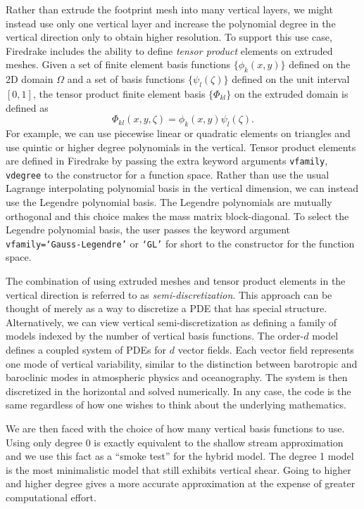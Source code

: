 \documentclass{article}
\theoremstyle{definition}
\theoremstyle{plain}
\begin{document}
Rather than extrude the footprint mesh into many vertical layers, we might instead use only one vertical layer and increase the polynomial degree in the vertical direction only to obtain higher resolution.
To support this use case, Firedrake includes the ability to define \emph{tensor product} elements on extruded meshes.
Given a set of finite element basis functions $\{\phi_k(x, y)\}$ defined on the 2D domain $\Omega$ and a set of basis functions $\{\psi_l(\zeta)\}$ defined on the unit interval $[0, 1]$, the tensor product finite element basis $\{\Phi_{kl}\}$ on the extruded domain is defined as
\begin{equation}
    \Phi_{kl}(x, y, \zeta) = \phi_k(x, y)\psi_l(\zeta).
\end{equation}
For example, we can use piecewise linear or quadratic elements on triangles and use quintic or higher degree polynomials in the vertical.
Tensor product elements are defined in Firedrake by passing the extra keyword arguments \texttt{vfamily}, \texttt{vdegree} to the constructor for a function space.
Rather than use the usual Lagrange interpolating polynomial basis in the vertical dimension, we can instead use the Legendre polynomial basis.
The Legendre polynomials are mutually orthogonal and this choice makes the mass matrix block-diagonal.
To select the Legendre polynomial basis, the user passes the keyword argument \texttt{vfamily=`Gauss-Legendre'} or \texttt{`GL'} for short to the constructor for the function space.

The combination of using extruded meshes and tensor product elements in the vertical direction is referred to as \emph{semi-discretization}.
This approach can be thought of merely as a way to discretize a PDE that has special structure.
Alternatively, we can view vertical semi-discretization as defining a family of models indexed by the number of vertical basis functions.
The order-$d$ model defines a coupled system of PDEs for $d$ vector fields.
Each vector field represents one mode of vertical variability, similar to the distinction between barotropic and baroclinic modes in atmospheric physics and oceanography.
The system is then discretized in the horizontal and solved numerically.
In any case, the code is the same regardless of how one wishes to think about the underlying mathematics.

We are then faced with the choice of how many vertical basis functions to use.
Using only degree 0 is exactly equivalent to the shallow stream approximation and we use this fact as a ``smoke test'' for the hybrid model.
The degree 1 model is the most minimalistic model that still exhibits vertical shear.
Going to higher and higher degree gives a more accurate approximation at the expense of greater computational effort.
\end{document}
